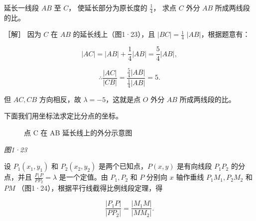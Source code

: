 延长一线段 \(AB\) 至 \(C\)， 使延长部分为原长度的 \(\frac{1}{4}\)， 求点
\(C\) 外分 \(AB\) 所成两线段的比。

［解］ 因为 \(C\) 在 \(AB\) 的延长线上（图1·23），且
\(|BC| = \frac{1}{4}\) \(|AB|\)，根据题意有：

\[
\left| AC \right| = \left| AB \right| + \frac {1}{4} \left| AB \right| = \frac {5}{4} \left| AB \right|,
\]

\[
\therefore \frac {| AC |}{| CB |} = \frac {\frac {5}{4} | AB |}{\frac {1}{4} | AB |} = 5.
\]

但 \(AC, CB\) 方向相反，故 \(\lambda = -5\)，这就是点 \(O\) 外分 \(AB\)
所成两线段的比。

下面我们用坐标法求定比分点的坐标。

\begin{figure}
\centering
{}
\caption{点 C 在 AB 延长线上的外分示意图}
\end{figure}

\emph{图1·23}

设 \(P_{1}(x_{1},y_{1})\) 和 \(P_{2}(x_{2},y_{2})\)
是两个已知点，\(P(x,y)\) 是有向线段 \(P_{1}P_{2}\) 的分点，并且
\(\frac{P_{1}P}{PP_{2}} = \lambda\) 是一个定值。由 \(P_{1},P_{2}\) 和
\(P\) 分别向 \(x\) 轴作垂线 \(P_{1}M_{1},P_{2}M_{2}\) 和 \(PM\)
（图1·24），根据平行线截得比例线段定理，得

\[
\frac {\left| P_{1} P \right|}{\left| PP_{2} \right|} = \frac {\left| M_{1} M \right|}{\left| MM_{2} \right|}.
\]

